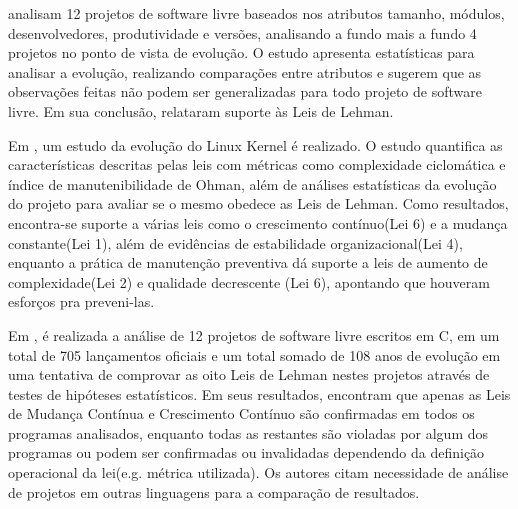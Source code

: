 \cite{carver2004impact} analisam 12 projetos de software livre baseados nos atributos tamanho, módulos, desenvolvedores, produtividade e versões, analisando a fundo mais a fundo 4 projetos no ponto de vista de evolução. O estudo apresenta estatísticas para analisar a evolução, realizando comparações entre atributos e sugerem que as observações feitas não podem ser generalizadas para todo projeto de software livre. Em sua conclusão, relataram suporte às Leis de Lehman.

Em \cite{israeli2010linux}, um estudo da evolução do Linux Kernel é realizado. O estudo quantifica as características descritas pelas leis com métricas como complexidade ciclomática e índice de manutenibilidade de Ohman, além de análises estatísticas da evolução do projeto para avaliar se o mesmo obedece as Leis de Lehman. Como resultados, encontra-se suporte a várias leis como o crescimento contínuo(Lei 6) e a mudança constante(Lei 1), além de evidências de estabilidade organizacional(Lei 4), enquanto a prática de manutenção preventiva dá suporte a leis de aumento de complexidade(Lei 2) e qualidade decrescente (Lei 6), apontando que houveram esforços pra preveni-las. 

Em \cite{neamtiu2013towards}, é realizada a análise de 12 projetos de software livre escritos em C, em um total de 705 lançamentos oficiais e um total somado de 108 anos de evolução em uma tentativa de comprovar as oito Leis de Lehman nestes projetos através de testes de hipóteses estatísticos. Em seus resultados, encontram que apenas as Leis de Mudança Contínua e Crescimento Contínuo são confirmadas em todos os programas analisados, enquanto todas as restantes são violadas por algum dos programas ou podem ser confirmadas ou invalidadas dependendo da definição operacional da lei(e.g. métrica utilizada). Os autores citam necessidade de análise de projetos em outras linguagens para a comparação de resultados.
